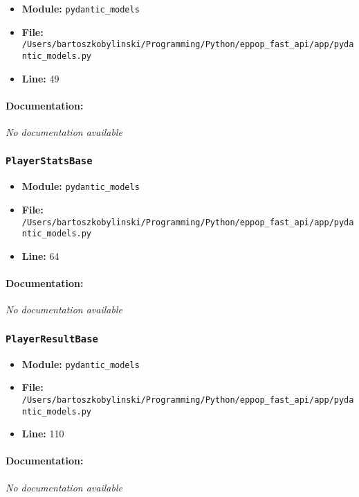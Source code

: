 \documentclass[11pt,a4paper]{article}
\begin{document}
\begin{itemize}
    \item \textbf{Module:} \texttt{pydantic\_models}
    \item \textbf{File:} \texttt{/Users/bartoszkobylinski/Programming/Python/eppop\_fast\_api/app/pydantic\_models.py}
    \item \textbf{Line:} 49
\end{itemize}

\paragraph{Documentation:} \textit{No documentation available}


\vspace{1em}
\subsubsection{\texttt{PlayerStatsBase}}

\begin{itemize}
    \item \textbf{Module:} \texttt{pydantic\_models}
    \item \textbf{File:} \texttt{/Users/bartoszkobylinski/Programming/Python/eppop\_fast\_api/app/pydantic\_models.py}
    \item \textbf{Line:} 64
\end{itemize}

\paragraph{Documentation:} \textit{No documentation available}


\vspace{1em}
\subsubsection{\texttt{PlayerResultBase}}

\begin{itemize}
    \item \textbf{Module:} \texttt{pydantic\_models}
    \item \textbf{File:} \texttt{/Users/bartoszkobylinski/Programming/Python/eppop\_fast\_api/app/pydantic\_models.py}
    \item \textbf{Line:} 110
\end{itemize}

\paragraph{Documentation:} \textit{No documentation available}
\end{document}
